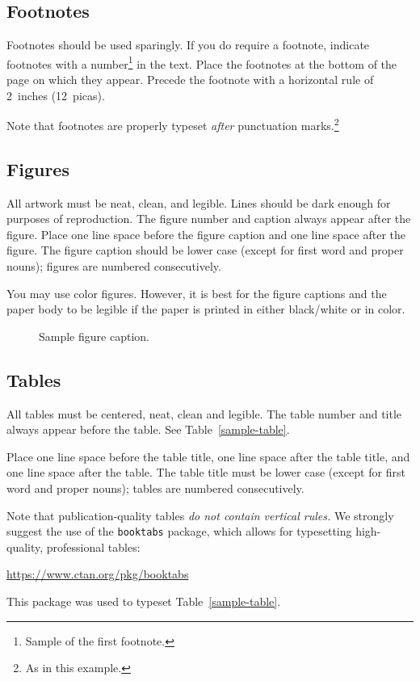 \documentclass{article}
\begin{document}
  \subsection{Footnotes}
  
  Footnotes should be used sparingly.  If you do require a footnote,
  indicate footnotes with a number\footnote{Sample of the first
    footnote.} in the text. Place the footnotes at the bottom of the
  page on which they appear.  Precede the footnote with a horizontal
  rule of 2~inches (12~picas).
  
  Note that footnotes are properly typeset \emph{after} punctuation
  marks.\footnote{As in this example.}
  
  \subsection{Figures}
  
  All artwork must be neat, clean, and legible. Lines should be dark
  enough for purposes of reproduction. The figure number and caption
  always appear after the figure. Place one line space before the figure
  caption and one line space after the figure. The figure caption should
  be lower case (except for first word and proper nouns); figures are
  numbered consecutively.
  
  You may use color figures.  However, it is best for the figure
  captions and the paper body to be legible if the paper is printed in
  either black/white or in color.
  \begin{figure}[h]
    \centering
    \fbox{\rule[-.5cm]{0cm}{4cm} \rule[-.5cm]{4cm}{0cm}}
    \caption{Sample figure caption.}
  \end{figure}
  
  \subsection{Tables}
  
  All tables must be centered, neat, clean and legible.  The table
  number and title always appear before the table.  See
  Table~\ref{sample-table}.
  
  Place one line space before the table title, one line space after the
  table title, and one line space after the table. The table title must
  be lower case (except for first word and proper nouns); tables are
  numbered consecutively.
  
  Note that publication-quality tables \emph{do not contain vertical
    rules.} We strongly suggest the use of the \verb+booktabs+ package,
  which allows for typesetting high-quality, professional tables:
  \begin{center}
    \url{https://www.ctan.org/pkg/booktabs}
  \end{center}
  This package was used to typeset Table~\ref{sample-table}.
  
\end{document}
